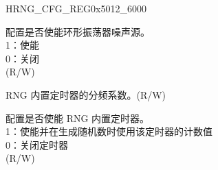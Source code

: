 \documentclass[main\_\_CN.tex]{subfiles}
\begin{document}
\begin{register}{H}{RNG\_CFG\_REG}{0x5012\_6000}\label{regdesc:RNGCFGREG}
%
%
%
%
\regnewline%
\begin{regdesc}\begin{reglist}

\label{fielddesc:RNGSAMPLEENABLE}\item [RNG\_SAMPLE\_ENABLE]
配置是否使能环形振荡器噪声源。\\
1：使能\\
0：关闭 \\(R/W)


\label{fielddesc:RNGTIMERPSCALE}\item [RNG\_TIMER\_PSCALE] RNG 内置定时器的分频系数。(R/W)

\label{fielddesc:RNGTIMEREN}\item [RNG\_RTC\_TIMER\_EN] 配置是否使能 RNG 内置定时器。\\
1：使能并在生成随机数时使用该定时器的计数值 \\
0：关闭定时器 \\
(R/W)


\end{reglist}\end{regdesc}
\end{register}
\end{document}
